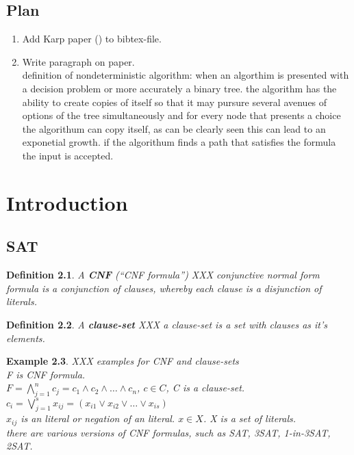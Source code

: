 \documentclass[a4paper]{report}
\newtheorem{defi}{Definition}[section]
\newtheorem{examp}[defi]{Example}
\begin{document}
\section{Plan}
\label{sec:Plan}

\begin{enumerate}
\item Add Karp paper (\cite{Karp1972NP}) to bibtex-file.
\item Write paragraph on paper.\\
definition of nondeterministic algorithm: when an algorthim is presented with a decision problem or more accurately a binary tree. the algorithm has the ability to create copies of itself so that it may pursure several avenues of options of the tree simultaneously and for every node that presents a choice the algorithum can copy itself, as can be clearly seen this can lead to an exponetial growth. if the algorithum finds a path that satisfies the formula the input is accepted. \cite{Karp1972NP}
\end{enumerate}



\chapter{Introduction}
\label{cha:Introduction}

\section{SAT}
\label{sec:BackgroundSAT}

\begin{defi}\label{def:CNF}
  A \textbf{CNF} (``CNF formula'')  XXX  conjunctive normal form formula is a conjunction of clauses, whereby each clause is a disjunction of literals.
\end{defi}

\begin{defi}\label{def:CLS}
  A \textbf{clause-set}  XXX a clause-set is a set with clauses as it's elements.
\end{defi}

\begin{examp}\label{exp:CLS}
  XXX examples for CNF and clause-sets\\
F is CNF formula.\\ 
$F = \bigwedge_{j=1}^{n} c_j = c_1 \wedge c_2 \wedge \dots \wedge c_n$,
$c \in C$,  C is a clause-set.\\
$c_i = \bigvee_{j=1}^{s} x_{ij} =  (x_{i1} \vee x_{i2} \vee \dots \vee x_{is})$\\
$x_{ij}$ is an literal or negation of an literal.
$x \in X$. X is a set of literals.\\

there are various versions of CNF formulas, such as SAT, 3SAT, 1-in-3SAT, 2SAT.
\end{examp}
\end{document}
